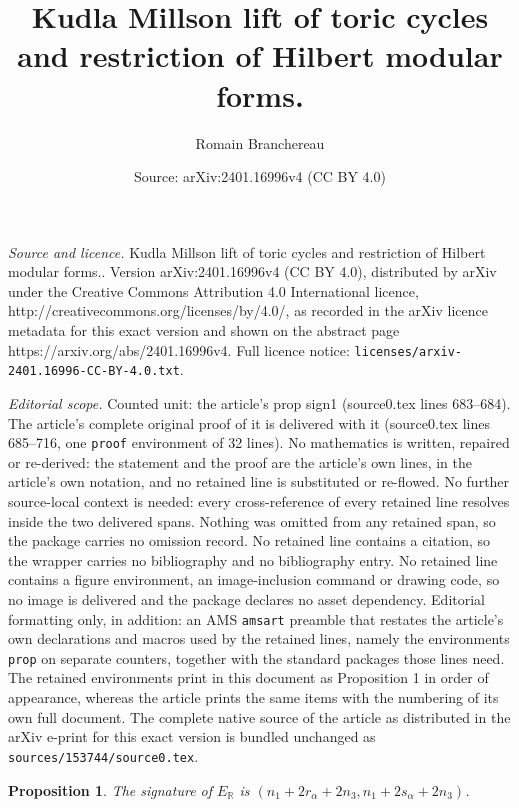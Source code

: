 \documentclass[10pt,a4paper]{amsart}
\title{\large Kudla Millson lift of toric cycles and restriction of Hilbert modular forms.}
\author{Romain Branchereau}
\date{Source: arXiv:2401.16996v4 (CC BY 4.0)}
\newtheorem{prop}{Proposition}
\newcommand{\R}{\mathbb{R}}
\begin{document}
\maketitle

\noindent\emph{Source and licence.} \large Kudla Millson lift of toric cycles and restriction of Hilbert modular forms.. Version arXiv:2401.16996v4 (CC BY 4.0), distributed by arXiv under the Creative Commons Attribution 4.0 International licence, http://creativecommons.org/licenses/by/4.0/, as recorded in the arXiv licence metadata for this exact version and shown on the abstract page https://arxiv.org/abs/2401.16996v4. Full licence notice: \texttt{licenses/arxiv-2401.16996-CC-BY-4.0.txt}.\par\smallskip

\noindent\textit{Editorial scope.} Counted unit: the article's prop sign1 (source0.tex lines 683--684). The article's complete original proof of it is delivered with it (source0.tex lines 685--716, one \texttt{proof} environment of 32 lines). No mathematics is written, repaired or re-derived: the statement and the proof are the article's own lines, in the article's own notation, and no retained line is substituted or re-flowed.  No further source-local context is needed: every cross-reference of every retained line resolves inside the two delivered spans.  Nothing was omitted from any retained span, so the package carries no omission record.  No retained line contains a citation, so the wrapper carries no bibliography and no bibliography entry.  No retained line contains a figure environment, an image-inclusion command or drawing code, so no image is delivered and the package declares no asset dependency.  Editorial formatting only, in addition: an AMS \texttt{amsart} preamble that restates the article's own declarations and macros used by the retained lines, namely the environments \texttt{prop} on separate counters, together with the standard packages those lines need.  The retained environments print in this document as Proposition 1 in order of appearance, whereas the article prints the same items with the numbering of its own full document.  The complete native source of the article as distributed in the arXiv e-print for this exact version is bundled unchanged as \texttt{sources/153744/source0.tex}.
\begin{prop} \label{sign1} The signature of $E_\R$ is $(n_1+2r_\alpha+2n_3,n_1+2s_\alpha+2n_3)$. 
\end{prop}
\end{document}
